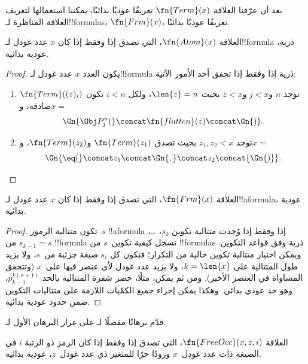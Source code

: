 \documentclass[../../../include/open-logic-section]{subfiles}
\begin{document}

بعد أن عرّفنا العلاقة $\fn{Term}(x)$ تعريفًا عوديًا بدائيًا، يمكننا
استعمالها لتعريف العلاقة المناظرة لـ!!{formula}s، $\fn{Frm}(x)$، تعريفًا عوديًا
بدائيًا.

\begin{prop}
العلاقة $\fn{Atom}(x)$، التي تصدق إذا وفقط إذا كان $x$ عدد غودل
لـ!!{formula} ذرية، عودية بدائية.
\end{prop}

\begin{proof}
يكون العدد $x$ عدد غودل لـ!!{formula} ذرية إذا وفقط إذا تحقق أحد
الأمور الآتية:
\begin{enumerate}
\item توجد $n$ و$j<x$ و$z<x$ بحيث $\len{z}=n$، ولكل $i<n$ تكون
  $\fn{Term}((z)_i)$ صادقة، و$x=$
\[
\Gn{\Obj P^n_j(} \concat \fn{flatten}(z) \concat \Gn{)}.
\]
\item توجد $z_1,z_2<x$ بحيث تصدق $\fn{Term}(z_1)$ و$\fn{Term}(z_2)$،
  و$x=$
\[
\Gn{{\eq}(} \concat z_1 \concat \Gn{,} \concat z_2 \concat{\Gn{)}}.
\]
\end{enumerate}
\end{proof}

\begin{prop}
العلاقة $\fn{Frm}(x)$، التي تصدق إذا وفقط إذا كان $x$ عدد غودل
لـ!!a{formula}، عودية بدائية.
\end{prop}

\begin{proof}
تكون متتالية الرموز~$s$ !!a{formula} إذا وفقط إذا وُجدت متتالية تكوين
$s_0$، \dots، $s_{k-1}=s$ من !!{formula} تسجل كيفية تكوين~$s$ من
!!{formula}s ذرية وفق قواعد التكوين. ويمكن اختيار متتالية تكوين خالية من
التكرار؛ فتكون كل $s_i$ صيغة جزئية من~$s$، ولا يزيد طول المتتالية على
$k=\len{x}$، ولا يزيد عدد غودل لأي عنصر فيها على~$x$ (وتتحقق المساواة
في العنصر الأخير). ومن ثم يمكن، مثلًا، حصر شفرة المتتالية بالحد
$p_{k-1}^{k(x+1)}$، وهو حد عودي بدائي. وهكذا يمكن إجراء جميع الكمّيات
اللازمة على متتاليات التكوين ضمن حدود عودية بدائية.
\end{proof}

\begin{prob}
قدّم برهانًا مفصلًا لـ على غرار
البرهان الأول لـ.
\end{prob}

\begin{prop}
العلاقة $\fn{FreeOcc}(x,z,i)$، التي تصدق إذا وفقط إذا كان الرمز ذو
الرتبة $i$ في الصيغة ذات عدد غودل~$x$ ورودًا حرًا للمتغير ذي عدد
غودل~$z$، عودية بدائية.
\end{prop}
\end{document}
